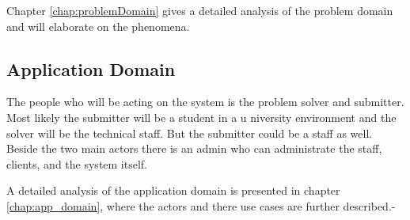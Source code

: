 Chapter \ref{chap:problemDomain} gives a detailed analysis of the problem domain and will elaborate on the phenomena.

\subsection{Application Domain}
The people who will be acting on the system is the problem solver and submitter. Most likely the submitter will be a student in a u niversity environment and the solver will be the technical staff. But the submitter could be a staff as well. Beside the two main actors there is an admin who can administrate the staff, clients, and the system itself.

A detailed analysis of the application domain is presented in chapter \ref{chap:app_domain}, where the actors and there use cases are further described.-